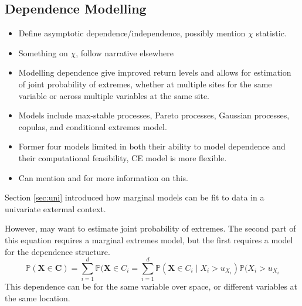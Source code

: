 \documentclass{article}
\numberwithin{equation}{section}
\begin{document}
\subsection{Dependence Modelling}
\begin{itemize}
  \item Define asymptotic dependence/independence, possibly mention $\chi$ statistic. 
  \item Something on $\chi$, follow narrative elsewhere
  \item Modelling dependence give improved return levels and allows for estimation of joint probability of extremes, whether at multiple sites for the same variable or across multiple variables at the same site.
  \item Models include max-stable processes, Pareto processes, Gaussian processes, copulas, and conditional extremes model.
  \item Former four models limited in both their ability to model dependence and their computational feasibility, CE model is more flexible.
  \item Can mention \cite{Tawn2018} and \cite{Huser2024} for more information on this.
\end{itemize}

Section \ref{sec:uni} introduced how marginal models can be fit to data in a univariate extermal context.

However, may want to estimate joint probability of extremes.
The second part of this equation requires a marginal extremes model, but the first requires a model for the dependence structure. 
\begin{equation} \label{eq:joint_prob}
  \mathbb{P}(\bm{X} \in \bm{C}) = \sum_{i=1}^{d}{\mathbb{P}(\bm{X} \in C_i} = 
  \sum_{i=1}^{d}{\mathbb{P}(\bm{X} \in C_i \mid X_i > u_{X_i}) \mathbb{P}(X_i > u_{X_i}}
\end{equation}
This dependence can be for the same variable over space, or different variables at the same location.
\end{document}
